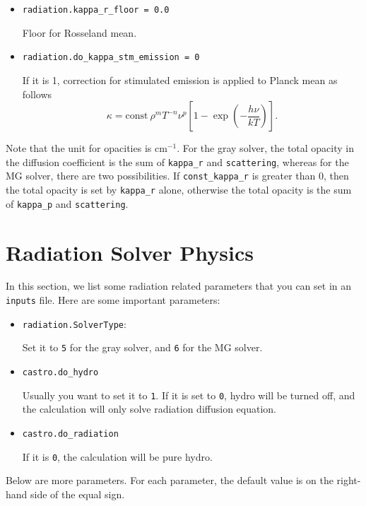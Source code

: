 \documentclass[11pt,letterpaper]{article}
\begin{document}
\begin{itemize}
\item {\tt radiation.kappa\_r\_floor = 0.0}

  Floor for Rosseland mean.

\item{\tt radiation.do\_kappa\_stm\_emission = 0}

  If it is 1, correction for stimulated emission is applied to Planck mean as
  follows
  \begin{equation}
    \kappa = \mathrm{const}\ \rho^{m} T^{-n} \nu^{p}
    \left [1-\exp{\left (-\frac{h\nu}{k T} \right )} \right ].
  \end{equation}
\end{itemize}

\noindent Note that the unit for opacities is $\mathrm{cm}^{-1}$.  For
the gray solver, the total opacity in the diffusion coefficient is the sum
of {\tt kappa\_r} and {\tt scattering}, whereas for the MG solver,
there are two possibilities.  If {\tt const\_kappa\_r} is greater than
0, then the total opacity is set by {\tt kappa\_r} alone, otherwise
the total opacity is the sum of {\tt kappa\_p} and {\tt scattering}.



\section{Radiation Solver Physics}

In this section, we list some radiation related parameters that you
can set in an {\tt inputs} file.  Here are some important parameters:
\begin{itemize}
\item {\tt radiation.SolverType}:

  Set it to {\tt 5} for the gray solver, and {\tt 6} for the MG solver.

\item {\tt castro.do\_hydro}

  Usually you want to set it to {\tt 1}.  If it is set to {\tt 0},
  hydro will be turned off, and the calculation will only solve
  radiation diffusion equation.

\item {\tt castro.do\_radiation}

  If it is {\tt 0}, the calculation will be pure hydro.
\end{itemize}

Below are more parameters.  For each parameter, the default value is
on the right-hand side of the equal sign.
\end{document}
